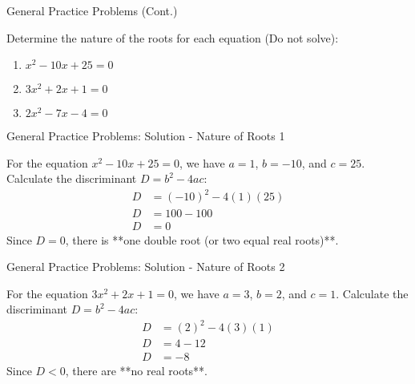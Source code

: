 \documentclass[aspectratio=169]{beamer}
\begin{document}
\begin{frame}{General Practice Problems (Cont.)}
    \begin{tcolorbox}[colback=lightgray,colframe=primary,title=Nature of Roots]
        \footnotesize
        Determine the nature of the roots for each equation (Do not solve):
        \begin{enumerate}
            \item $x^2 - 10x + 25 = 0$
            \item $3x^2 + 2x + 1 = 0$
            \item $2x^2 - 7x - 4 = 0$
        \end{enumerate}
    \end{tcolorbox}
\end{frame}

\begin{frame}{General Practice Problems: Solution - Nature of Roots 1}
    \begin{tcolorbox}[colback=lightgray,colframe=accent,title=Solution: $x^2 - 10x + 25 = 0$]
        \footnotesize
        For the equation $x^2 - 10x + 25 = 0$, we have $a=1$, $b=-10$, and $c=25$.
        Calculate the discriminant $D = b^2 - 4ac$:
        \begin{align*}
            D &= (-10)^2 - 4(1)(25) \\
            D &= 100 - 100 \\
            D &= 0
        \end{align*}
        Since $D=0$, there is **one double root (or two equal real roots)**.
    \end{tcolorbox}
\end{frame}

\begin{frame}{General Practice Problems: Solution - Nature of Roots 2}
    \begin{tcolorbox}[colback=lightgray,colframe=accent,title=Solution: $3x^2 + 2x + 1 = 0$]
        \footnotesize
        For the equation $3x^2 + 2x + 1 = 0$, we have $a=3$, $b=2$, and $c=1$.
        Calculate the discriminant $D = b^2 - 4ac$:
        \begin{align*}
            D &= (2)^2 - 4(3)(1) \\
            D &= 4 - 12 \\
            D &= -8
        \end{align*}
        Since $D<0$, there are **no real roots**.
    \end{tcolorbox}
\end{frame}
\end{document}
